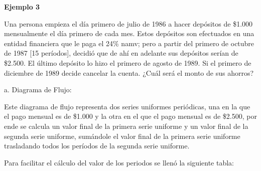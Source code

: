 \clearpage

\textbf{Ejemplo 3}

\newline \vspace{1mm}

Una persona empieza el día primero de julio de 1986 a hacer depósitos de \$1.000 mensualmente el día primero de cada mes. Estos depósitos son efectuados en una entidad financiera que le paga el 24\% namv; pero a partir del primero de octubre de 1987 [15 períodos], decidió que de ahí en adelante sus depósitos serían de \$2.500. El último depósito lo hizo el primero de agosto de 1989. Si el primero de diciembre de 1989 decide cancelar la cuenta. ¿Cuál será el monto de sus ahorros?

\newline \vspace{2mm}

a. Diagrama de Flujo:

\newline \vspace{2mm}
Este diagrama de flujo representa dos series uniformes periódicas, una en la que el pago mensual es de \$1.000 y la otra en el que el pago mensual es de \$2.500, por ende se calcula un valor final de la primera serie uniforme y un valor final de la segunda serie uniforme, sumándole el valor final de la primera serie uniforme trasladando todos los períodos de la segunda serie uniforme.

\newline \vspace{2mm}

Para facilitar el cálculo del valor de los periodos se llenó la siguiente tabla:

